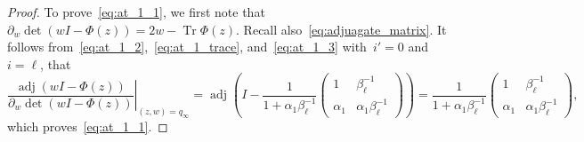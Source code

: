 \documentclass[11pt]{article}
\theoremstyle{plain}
\theoremstyle{definition}
\numberwithin{equation}{section}
\DeclareMathOperator{\Tr}{Tr}
\DeclareMathOperator{\adj}{adj}
\begin{document}
\begin{proof}
To prove~\eqref{eq:at_1_1}, we first note that~$\partial_w\det(wI-\Phi(z))=2w-\Tr\Phi(z)$. Recall also~\eqref{eq:adjuagate_matrix}. It follows from~\eqref{eq:at_1_2},~\eqref{eq:at_1_trace}, and~\eqref{eq:at_1_3} with~$i'=0$ and~$i=\ell$, that
\begin{equation}
\left.\frac{\adj\left(wI-\Phi(z)\right)}{\partial_w\det(wI-\Phi(z))}\right|_{(z,w)=q_\infty}=\adj\left(I-\frac{1}{1+\alpha_1\beta_\ell^{-1}}
\begin{pmatrix}
1 & \beta_\ell^{-1} \\
\alpha_1 & \alpha_1\beta_\ell^{-1}
\end{pmatrix}\right)
=
\frac{1}{1+\alpha_1\beta_\ell^{-1}}
\begin{pmatrix}
1 & \beta_\ell^{-1} \\
\alpha_1 & \alpha_1\beta_\ell^{-1}
\end{pmatrix},
\end{equation}
which proves~\eqref{eq:at_1_1}. 
\end{proof}
\end{document}
